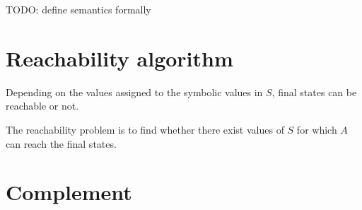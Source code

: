 \documentclass[letterpaper,11pt]{article}
\newcommand{\loris}{\textcolor[rgb]{0.00,0.00,1.00}}
\begin{document}
\loris{TODO: define semantics formally}

\section{Reachability algorithm}

Depending on the values assigned to the symbolic values in $S$, final states can be reachable or not.

The reachability problem is to find whether there exist values of $S$ for which $A$ can reach the final states.

\section{Complement}

\cite{jurg14}



\end{document}
